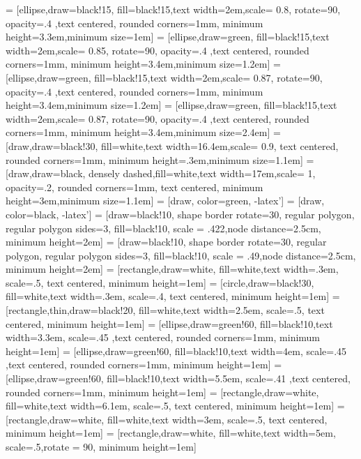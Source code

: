 
\usepackage{tikz}
\usetikzlibrary{shapes,arrows}
\usetikzlibrary{positioning,shadows,arrows}
\usetikzlibrary{calc}
\usepackage{verbatim}
 = [ellipse,draw=black!15, fill=black!15,text width=2em,scale= 0.8, rotate=90, opacity=.4 ,text centered, rounded corners=1mm, minimum height=3.3em,minimum size=1em]
 = [ellipse,draw=green, fill=black!15,text width=2em,scale= 0.85, rotate=90, opacity=.4 ,text centered, rounded corners=1mm, minimum height=3.4em,minimum size=1.2em]
 = [ellipse,draw=green, fill=black!15,text width=2em,scale= 0.87, rotate=90, opacity=.4 ,text centered, rounded corners=1mm, minimum height=3.4em,minimum size=1.2em]
 = [ellipse,draw=green, fill=black!15,text width=2em,scale= 0.87, rotate=90, opacity=.4 ,text centered, rounded corners=1mm, minimum height=3.4em,minimum size=2.4em]
 = [draw,draw=black!30, fill=white,text width=16.4em,scale= 0.9, text centered, rounded corners=1mm, minimum height=.3em,minimum size=1.1em]
 = [draw,draw=black, densely dashed,fill=white,text width=17em,scale= 1, opacity=.2, rounded corners=1mm, text centered, minimum height=3em,minimum size=1.1em]
 = [draw,  color=green, -latex']
 = [draw,  color=black, -latex']
 = [draw=black!10, shape border rotate=30, regular polygon, regular polygon sides=3, fill=black!10, scale = .422,node distance=2.5cm, minimum height=2em]
 = [draw=black!10, shape border rotate=30, regular polygon, regular polygon sides=3, fill=black!10, scale = .49,node distance=2.5cm, minimum height=2em]
 = [rectangle,draw=white, fill=white,text width=.3em, scale=.5, text centered, minimum height=1em]
 = [circle,draw=black!30, fill=white,text width=.3em, scale=.4, text centered, minimum height=1em]
 = [rectangle,thin,draw=black!20, fill=white,text width=2.5em, scale=.5, text centered, minimum height=1em]
 = [ellipse,draw=green!60, fill=black!10,text width=3.3em, scale=.45 ,text centered, rounded corners=1mm, minimum height=1em]
 = [ellipse,draw=green!60, fill=black!10,text width=4em, scale=.45 ,text centered, rounded corners=1mm, minimum height=1em]
 = [ellipse,draw=green!60, fill=black!10,text width=5.5em, scale=.41 ,text centered, rounded corners=1mm, minimum height=1em]
 = [rectangle,draw=white, fill=white,text width=6.1em, scale=.5, text centered, minimum height=1em]
 = [rectangle,draw=white, fill=white,text width=3em, scale=.5, text centered, minimum height=1em]
 = [rectangle,draw=white, fill=white,text width=5em, scale=.5,rotate = 90, minimum height=1em]

